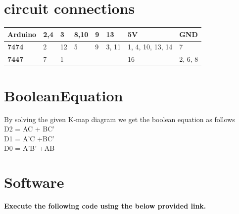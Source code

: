 \documentclass[12pt, a4paper]{article}
\begin{document}
\section{ circuit connections}
     
        \begin{center}
\begin{tabular}{ | m{5.0em} | m{1.0cm}| m{1.0cm} |m{1.0cm} |m{0.5cm} |m{1.0cm} |m{4.0cm} |m{3.0cm} | } 
  \hline
  \textbf{Arduino} & 2,4 & 3& 8,10& 9& 13& 5V& GND \\ 
  \hline
  \textbf{7474} & 2 & 12 & 5&9 &3, 11& 1, 4, 10, 13, 14& 7\\ 
  \hline
  \textbf{7447} & 7 & 1 & & & & 16& 2, 6, 8\\ 
  \hline
\end{tabular}
\end{center}

\section{BooleanEquation}
By solving the given K-map diagram we get the boolean equation as follows \\ 
D2 = AC + BC'\\
D1 = A'C +BC'\\
D0 = A'B' +AB\\


\section{Software}
\textbf{Execute the following code using the below provided link.}\\


\begin{center}
\end{center}
 

\vspace{5mm}   


\end{document}
